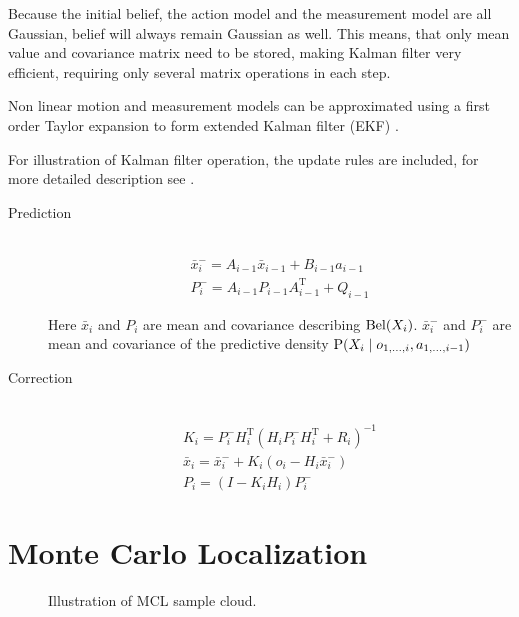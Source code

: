 Because the initial belief, the action model and the measurement model are all Gaussian,
belief will always remain Gaussian as well.
This means, that only mean value and covariance matrix need to be stored, making
Kalman filter very efficient, requiring only several matrix operations in each step.

Non linear motion and measurement models can be approximated
using a first order Taylor expansion to form extended Kalman
filter (EKF) \cite{welch95}.

For illustration of Kalman filter operation, the update rules are included,
for more detailed description see \cite{welch95}.

\begin{description}
\item[Prediction] \hfill \\
\begin{gather}
	\bar{x}^{-}_i = A_{i - 1}\bar{x}_{i-1} + B_{i - 1}a_{i - 1}
	\\
	P^{-}_i = A_{i - 1}P_{i - 1}A^\mathrm{T}_{i - 1} + Q_{i - 1}
\end{gather}

Here \(\bar{x}_i\) and \(P_i\) are mean and covariance describing \(\operatorname{\mathrm{Bel}}(X_i)\).
\(\bar{x}^{-}_i\) and \(P^{-}_i\) are mean and covariance of the predictive density
\(\operatorname{\mathrm{P}}(X_i \mid o_{1, \dotsc, i}, a_{1, \dotsc, i - 1})\)

\item[Correction] \hfill \\
\begin{gather}
	\label{eq:kalman-gain}
	K_i = P^{-}_{i}H^\mathrm{T}_{i}(H_{i}P^{-}_{i}H^\mathrm{T}_{i} + R_{i})^{-1}
	\\
	\bar{x}_i = \bar{x}^{-}_i + K_i (o_i - H_{i}\bar{x}^{-}_i)
	\\
	P_i = (I - K_{i}H_{i})P^{-}_i
\end{gather}
\end{description}


\section{Monte Carlo Localization}
\label{sec:mcl-algorithm}

\begin{figure}[h]
	\centering
%	
	\caption{Illustration of MCL sample cloud.}
	\label{fig:mcl}
\end{figure}

